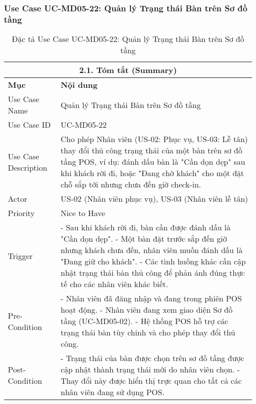 \subsubsection{Use Case UC-MD05-22: Quản lý Trạng thái Bàn trên Sơ đồ tầng}
\begin{longtable}{|m{4cm}|p{11cm}|}
\caption{Đặc tả Use Case UC-MD05-22: Quản lý Trạng thái Bàn trên Sơ đồ tầng} \label{tab:uc_md05_22_final} \\
\hline
\multicolumn{2}{|c|}{\textbf{2.1. Tóm tắt (Summary)}} \\
\hline
\textbf{Mục} & \textbf{Nội dung} \\
\hline
\endhead %
\hline
\endfoot %
\hline
\endlastfoot %
Use Case Name & Quản lý Trạng thái Bàn trên Sơ đồ tầng \\
\hline
Use Case ID & UC-MD05-22 \\
\hline
Use Case Description & Cho phép Nhân viên (US-02: Phục vụ, US-03: Lễ tân) thay đổi thủ công trạng thái của một bàn trên sơ đồ tầng POS, ví dụ: đánh dấu bàn là "Cần dọn dẹp" sau khi khách rời đi, hoặc "Đang chờ khách" cho một đặt chỗ sắp tới nhưng chưa đến giờ check-in. \\
\hline
Actor & US-02 (Nhân viên phục vụ), US-03 (Nhân viên lễ tân) \\
\hline
Priority & Nice to Have \\
\hline
Trigger & - Sau khi khách rời đi, bàn cần được đánh dấu là "Cần dọn dẹp". \newline - Một bàn đặt trước sắp đến giờ nhưng khách chưa đến, nhân viên muốn đánh dấu là "Đang giữ cho khách". \newline - Các tình huống khác cần cập nhật trạng thái bàn thủ công để phản ánh đúng thực tế cho các nhân viên khác biết. \\
\hline
Pre-Condition & - Nhân viên đã đăng nhập và đang trong phiên POS hoạt động. \newline - Nhân viên đang xem giao diện Sơ đồ tầng (UC-MD05-02). \newline - Hệ thống POS hỗ trợ các trạng thái bàn tùy chỉnh và cho phép thay đổi thủ công. \\
\hline
Post-Condition & - Trạng thái của bàn được chọn trên sơ đồ tầng được cập nhật thành trạng thái mới do nhân viên chọn. \newline - Thay đổi này được hiển thị trực quan cho tất cả các nhân viên đang sử dụng POS. \\

\end{longtable}
